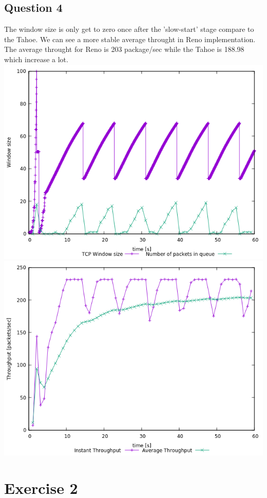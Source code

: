 \documentclass{article}
\begin{document}
\subsection{Question 4}

The window size is only get to zero once after the 'slow-start' stage compare to the Tahoe. We can see a more stable average throught in Reno implementation. The average throught for Reno is 203 package/sec while the Tahoe is 188.98 which increase a lot. \\
\includegraphics[width=\textwidth]{ex1q4-1.png}
\includegraphics[width=\textwidth]{ex1q4-2.png}
\section{Exercise 2}
\end{document}
